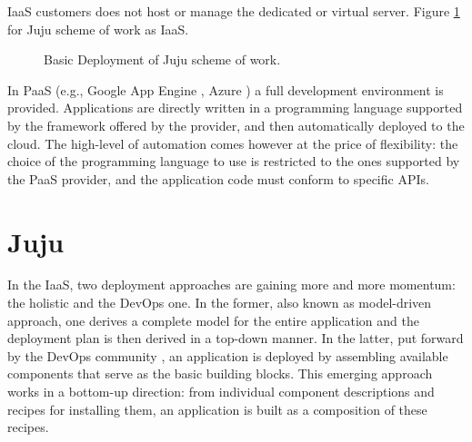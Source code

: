 \documentclass[9pt,twocolumn,twoside]{../../styles/osajnl}
\begin{document}
IaaS customers does not host or manage the dedicated or virtual
server. Figure \ref{fig:juju-scheme-of-work-yurkevich} for Juju
scheme of work as IaaS.

\begin{figure}[htbp]
  \centering
  \caption{Basic Deployment of Juju scheme of work.}
  \label{fig:juju-scheme-of-work-yurkevich}
\end{figure}


In PaaS (e.g., Google App Engine \cite{www-googleappengine}, Azure
\cite{www-azure}) a full development environment is
provided. Applications are directly written in a programming language
supported by the framework offered by the provider, and then
automatically deployed to the cloud. The high-level of automation
comes however at the price of flexibility: the choice of the
programming language to use is restricted to the ones supported by the
PaaS provider, and the application code must conform to specific APIs.

\section{Juju}

In the IaaS, two deployment approaches \cite{lascu2015automatic} are
gaining more and more momentum: the holistic and the DevOps one.  In
the former, also known as model-driven approach, one derives a
complete model for the entire application and the deployment plan is
then derived in a top-down manner. In the latter, put forward by the
DevOps community \cite{www-devOps}, an application is deployed by
assembling available components that serve as the basic building
blocks. This emerging approach works in a bottom-up direction: from
individual component descriptions and recipes for installing them, an
application is built as a composition of these recipes.
\end{document}
